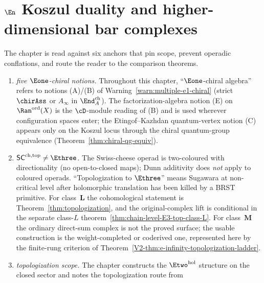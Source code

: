 \chapter{\texorpdfstring{$\En$ Koszul duality and higher-dimensional bar complexes}{En Koszul duality and higher-dimensional bar complexes}}
\label{ch:en-koszul-duality}


\begin{remark}
\label{rem:en-koszul-six-anchors}
The chapter is read against six anchors that pin scope, prevent
operadic conflations, and route the reader to the
comparison theorems.

\begin{enumerate}[label=\textup{(\Alph*)}]
\item \emph{five $\Eone$-chiral notions.}
 Throughout this chapter, ``$\Eone$-chiral algebra'' refers to
 notions \textup{(A)}/\textup{(B)} of
 Warning~\ref{warn:multiple-e1-chiral} (strict $\chirAss$ or
 $A_\infty$ in $\End^{\mathrm{ch}}_A$). The factorization-algebra
 notion \textup{(E)} on $\Ran^{\mathrm{ord}}(X)$ is the
 $\cD$-module reading of \textup{(B)} and is used wherever
 configuration spaces enter; the Etingof--Kazhdan quantum-vertex
 notion \textup{(C)} appears only on the Koszul locus through the
 chiral quantum-group equivalence
 (Theorem~\ref{thm:chiral-qg-equiv}).
\item \emph{$\mathsf{SC}^{\mathrm{ch,top}}\ne\Ethree$.}
 The Swiss-cheese operad is two-coloured with directionality
 (no open-to-closed maps); Dunn additivity does \emph{not} apply
 to coloured operads. ``Topologization to $\Ethree$'' means
 Sugawara at non-critical level after holomorphic translation has
 been killed by a BRST primitive. For class~$\mathbf{L}$ the
 cohomological statement is Theorem~\ref{thm:topologization},
 and the original-complex lift is conditional in the separate
 class-$L$ theorem~\ref{thm:chain-level-E3-top-class-L}. For
 class~$\mathbf{M}$ the ordinary direct-sum complex is not the
 proved surface; the usable construction is the weight-completed
 or coderived one, represented here by the finite-rung criterion
 of Theorem~\ref{V2-thm:e-infinity-topologization-ladder}.
\item \emph{topologization scope.}
 The chapter constructs the $\Etwo^{\mathrm{hol}}$ structure on
 the closed sector and notes the topologization route from

\end{enumerate}
\end{remark}
